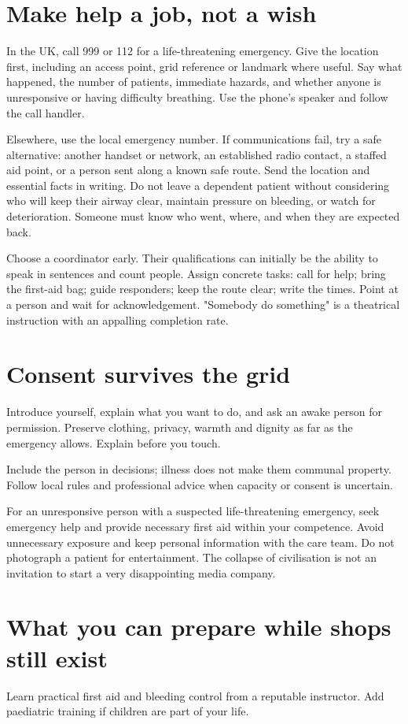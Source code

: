 \documentclass[10pt,openright]{book}
\begin{document}
\section*{Make help a job, not a wish}
In the UK, call 999 or 112 for a life-threatening emergency. Give the location first, including an access point, grid reference or landmark where useful. Say what happened, the number of patients, immediate hazards, and whether anyone is unresponsive or having difficulty breathing. Use the phone's speaker and follow the call handler.

Elsewhere, use the local emergency number. If communications fail, try a safe alternative: another handset or network, an established radio contact, a staffed aid point, or a person sent along a known safe route. Send the location and essential facts in writing. Do not leave a dependent patient without considering who will keep their airway clear, maintain pressure on bleeding, or watch for deterioration. Someone must know who went, where, and when they are expected back.

Choose a coordinator early. Their qualifications can initially be the ability to speak in sentences and count people. Assign concrete tasks: call for help; bring the first-aid bag; guide responders; keep the route clear; write the times. Point at a person and wait for acknowledgement. "Somebody do something" is a theatrical instruction with an appalling completion rate.

\section*{Consent survives the grid}
Introduce yourself, explain what you want to do, and ask an awake person for permission. Preserve clothing, privacy, warmth and dignity as far as the emergency allows. Explain before you touch.

Include the person in decisions; illness does not make them communal property. Follow local rules and professional advice when capacity or consent is uncertain.

For an unresponsive person with a suspected life-threatening emergency, seek emergency help and provide necessary first aid within your competence. Avoid unnecessary exposure and keep personal information with the care team. Do not photograph a patient for entertainment. The collapse of civilisation is not an invitation to start a very disappointing media company.

\section*{What you can prepare while shops still exist}
Learn practical first aid and bleeding control from a reputable instructor. Add paediatric training if children are part of your life.
\end{document}
